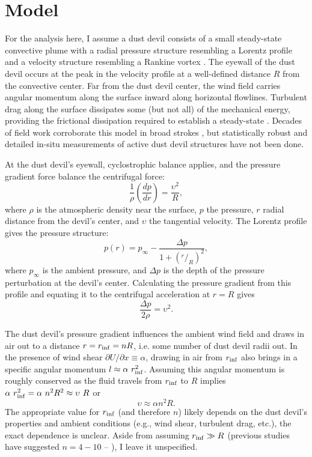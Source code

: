 \documentclass{aastex63}
\begin{document}
\section{Model} \label{sec:model}
For the analysis here, I assume a dust devil consists of a small steady-state convective plume with a radial pressure structure resembling a Lorentz profile and a velocity structure resembling a Rankine vortex \citep{2016SSRv..203..209K}. The eyewall of the dust devil occurs at the peak in the velocity profile at a well-defined distance $R$ from the convective center. Far from the dust devil center, the wind field carries angular momentum along the surface inward along horizontal flowlines. Turbulent drag along the surface dissipates some (but not all) of the mechanical energy, providing the frictional dissipation required to establish a steady-state \citep{1998JAtS...55.3244R}. Decades of field work corroborate this model in broad strokes \citep[e.g.][]{2016SSRv..203...39M}, but statistically robust and detailed in-situ measurements of active dust devil structures have not been done.

At the dust devil's eyewall, cyclostrophic balance applies, and the pressure gradient force balance the centrifugal force:
\begin{equation}
    \dfrac{1}{\rho}\left( \dfrac{dp}{dr} \right) = \dfrac{\upsilon^2}{R},
\end{equation}
where $\rho$ is the atmospheric density near the surface, $p$ the pressure, $r$ radial distance from the devil's center, and $\upsilon$ the tangential velocity. The Lorentz profile gives the pressure structure:
\begin{equation}
    p(r) = p_{\infty} - \dfrac{\Delta p}{1 + \left( ^r/_R \right)^2},\label{eqn:pressure_profile}
\end{equation}
where $p_{\infty}$ is the ambient pressure, and $\Delta p$ is the depth of the pressure perturbation at the devil's center. Calculating the pressure gradient from this profile and equating it to the centrifugal acceleration at $r = R$ gives
\begin{equation}
    \dfrac{\Delta p}{2\rho} = \upsilon^2.\label{eqn:cyclostrophic_balance}
\end{equation}

The dust devil's pressure gradient influences the ambient wind field and draws in air out to a distance $r = r_{\rm inf} = n R$, i.e. some number of dust devil radii out. In the presence of wind shear $\partial U/\partial x \equiv \alpha$, drawing in air from $r_{\rm inf}$ also brings in a specific angular momentum $l \approx \alpha\ r_{\rm inf}^2$. Assuming this angular momentum is roughly conserved as the fluid travels from $r_{\rm inf}$ to $R$ implies $\alpha\ r_{\rm inf}^2 = \alpha\ n^2 R^2 \approx \upsilon\ R$ or 
\begin{equation}
    \upsilon \approx \alpha n^2 R.
\end{equation}
The appropriate value for $r_{\rm inf}$ (and therefore $n$) likely depends on the dust devil's properties and ambient conditions (e.g., wind shear, turbulent drag, etc.), the exact dependence is unclear. Aside from assuming $r_{\rm inf} \gg R$ (previous studies have suggested $n = 4-10$ -- \citealp{2001JAtS...58..927R}), I leave it unspecified.
\end{document}
